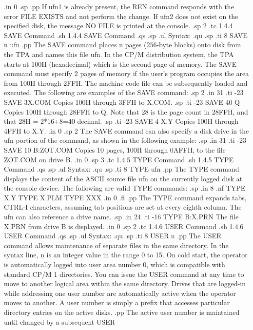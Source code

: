 .in 0
.sp
.pp
If ufn1 is already present, the REN command responds with the
error FILE EXISTS and not perform the change.  If ufn2 does not exist on
the specified disk, the message NO FILE is printed at the console.
.sp 2
.tc         1.4.4  SAVE Command
.sh
1.4.4  SAVE Command
.qs
.sp
.ul
Syntax:
.qu
.sp
.ti 8
SAVE n ufn
.pp
The SAVE command places n pages (256-byte blocks) onto disk from the TPA
and names this file ufn.  In the CP/M distribution system, the TPA starts
at 100H (hexadecimal) which is the second page of memory.  The SAVE command
must specify 2 pages of memory if the user's program occupies the area
from 100H through 2FFH.  The machine code file can be subsequently loaded
and executed.  The following are examples of the SAVE command:
.sp 2
.in 31
.ti -23
SAVE 3X.COM            Copies 100H through 3FFH to X.COM.
.sp
.ti -23
SAVE 40 Q              Copies 100H through 28FFH to Q.  Note that 28 is the
page count in 28FFH, and that 28H = 2*16+8=40 decimal.
.sp
.ti -23
SAVE 4 X.Y             Copies 100H through 4FFH to X.Y.
.in 0
.sp 2
The SAVE command can also specify a disk drive in the ufn portion of the
command, as shown in the following example:
.sp
.in 31
.ti -23
SAVE 10 B:ZOT.COM      Copies 10 pages, 100H through 0AFFH, to the
file ZOT.COM on drive B.
.in 0
.sp 3
.tc         1.4.5  TYPE Command
.sh
1.4.5  TYPE Command
.qs
.sp
.ul
Syntax:
.qu
.sp
.ti 8
TYPE ufn
.pp
The TYPE command displays the content of the ASCII source file ufn on the
currently logged disk at the console device.  The following are valid
TYPE commands:
.sp
.in 8
.nf
TYPE X.Y
TYPE X.PLM
TYPE XXX
.in 0
.fi
.pp
The TYPE command expands tabs, CTRL-I characters, assuming tab positions are
set at every eighth column.  The ufn can also reference a drive name.
.sp
.in 24
.ti -16
TYPE B:X.PRN    The file X.PRN from drive B is displayed.
.in 0
.sp 2
.tc         1.4.6  USER Command
.sh
1.4.6  USER Command
.qs
.sp
.ul
Syntax:
.qu
.sp
.ti 8
USER n
.pp
The USER command allows maintenance of separate files in the same 
directory.  In the syntax line, n is an integer value in the range 0 to
15.  On cold start, the operator is automatically logged into user
area number 0, which is
compatible with standard CP/M 1 directories.  You can issue the
USER command at any time to move to another logical area within the same
directory.  Drives that are logged-in while addressing one user number are
automatically active when the operator moves to another.  A user number is
simply a prefix that accesses particular directory entries on the active
disks.
.pp
The active user number is maintained until changed by a subsequent USER

